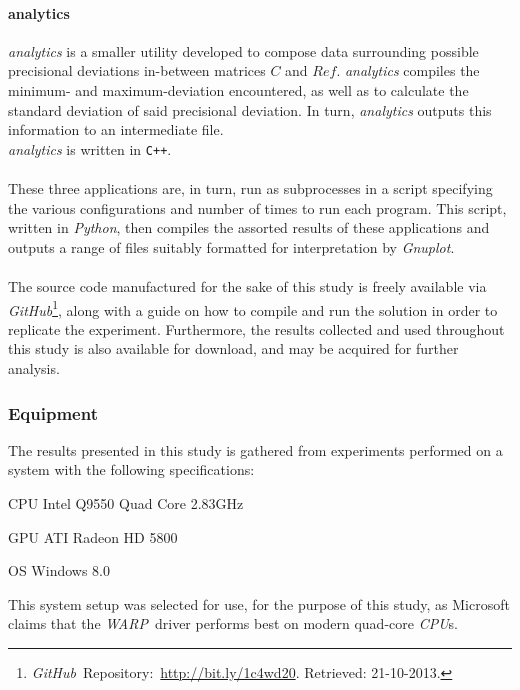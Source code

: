 \documentclass[fleqn,10pt]{SelfArx} %
\begin{document}
\paragraph{analytics}
\textit{analytics} is a smaller utility developed to compose data surrounding possible precisional deviations in-between matrices $C$ and $Ref$. \textit{analytics} compiles the minimum- and maximum-deviation encountered, as well as to calculate the standard deviation of said precisional deviation. In turn, \textit{analytics} outputs this information to an intermediate file.\\
\textit{analytics} is written in \texttt{C++}.\\
\\
\noindent
These three applications are, in turn, run as subprocesses in a script specifying the various configurations and number of times to run each program. This script, written in \textit{Python}, then compiles the assorted results of these applications and outputs a range of files suitably formatted for interpretation by \textit{Gnuplot}.\\
\\
The source code manufactured for the sake of this study is freely available via \textit{GitHub}\footnote{\label{lab:github}\textit{GitHub}~Repository:~\url{http://bit.ly/1c4wd20}. Retrieved: 21-10-2013.}, along with a guide on how to compile and run the solution in order to replicate the experiment. Furthermore, the results collected and used throughout this study is also available for download, and may be acquired for further analysis.

\subsubsection{Equipment}
\label{sec:contribution:equipment}
The results presented in this study is gathered from experiments performed on a system with the following specifications:
\begin{description*}
	\item[CPU]	Intel Q9550 Quad Core 2.83GHz
	\item[GPU]	ATI Radeon HD 5800
	\item[OS]	Windows 8.0
\end{description*}
This system setup was selected for use, for the purpose of this study, as Microsoft claims that the \textit{WARP}~driver performs best on modern quad-core \textit{CPU}s.
\end{document}
